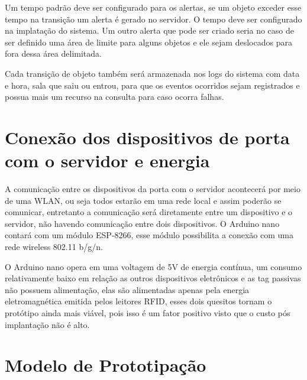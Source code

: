 \par
Um tempo padrão deve ser configurado para os alertas, se um objeto exceder esse tempo na transição um alerta é gerado no servidor. 
O tempo deve ser configurado na implatação do sistema. Um outro alerta que pode ser criado seria no caso de ser definido uma área de limite para alguns objetos e ele sejam deslocados para fora dessa área delimitada.
\par
Cada transição de objeto também será armazenada nos logs do sistema com data e hora, sala que saiu ou entrou, para que os eventos ocorridos sejam registrados e possua mais um recurso na consulta para caso ocorra falhas.


\section{Conexão dos dispositivos de porta com o servidor e energia}
A comunicação entre os dispositivos da porta com o servidor acontecerá por meio de uma WLAN, ou seja todos estarão em uma rede 
local e assim poderão se comunicar, entretanto a comunicação será diretamente entre um dispositivo e o servidor, 
não havendo comunicação entre dois dispositivos. O Arduino nano contará com um módulo ESP-8266, esse módulo possibilita a 
conexão com uma rede wireless 802.11 b/g/n.

\par
O Arduino nano opera em uma voltagem de 5V de energia contínua, um consumo relativamente baixo em relação as outros dispositivos eletrônicos e as tag passivas não possuem alimentação, elas são alimentadas apenas pela energia eletromagnética emitida pelos leitores RFID, esses dois quesitos tornam o protótipo ainda mais viável, pois isso é um fator positivo visto que o custo pós implantação não é alto.


\section{Modelo de Prototipação}

